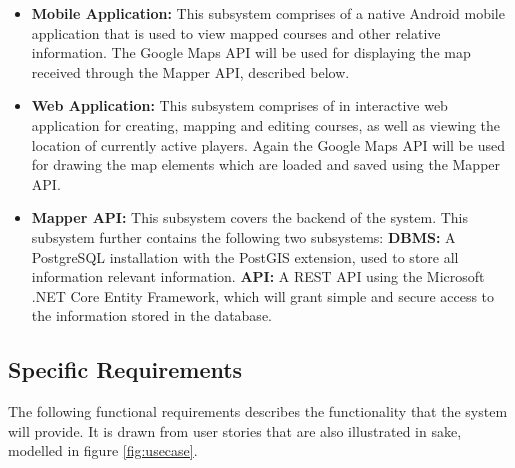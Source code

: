 \documentclass{article}
\begin{document}
    \begin{itemize}
        \item \textbf{Mobile Application:} This subsystem comprises of a native
            Android mobile application that is used to view mapped courses and
            other relative information. The Google Maps API will be used for
            displaying the map received through the Mapper API, described
            below.
        \item \textbf{Web Application:} This subsystem comprises of in
            interactive web application for creating, mapping and editing
            courses, as well as viewing the location of currently active
            players. Again the Google Maps API will be used for drawing the map
            elements which are loaded and saved using the Mapper API.
        \item \textbf{Mapper API:} This subsystem covers the backend of the
            system. This subsystem further contains the following two
            subsystems:
            \subitem \textbf{DBMS:} A PostgreSQL installation with the PostGIS
            extension, used to store all information relevant information.
            \subitem \textbf{API:} A REST API using the Microsoft .NET Core
            Entity Framework, which will grant simple and secure access to the
            information stored in the database.
    \end{itemize}


    \subsection{Specific Requirements}
    \label{sec:requirements}

    The following functional requirements describes the functionality that the
    system will provide. It is drawn from user stories that are also
    illustrated in sake, modelled in figure \ref{fig:usecase}.
\end{document}

